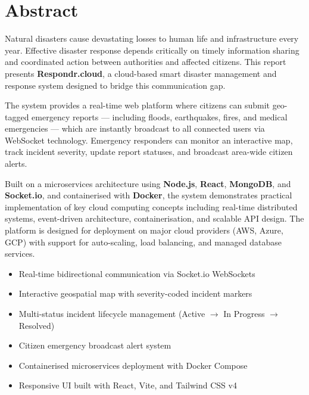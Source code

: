 \documentclass[12pt, a4paper]{report}
\begin{document}
\chapter*{Abstract}

Natural disasters cause devastating losses to human life and infrastructure every year. Effective disaster response depends critically on timely information sharing and coordinated action between authorities and affected citizens. This report presents \textbf{Respondr.cloud}, a cloud-based smart disaster management and response system designed to bridge this communication gap.

The system provides a real-time web platform where citizens can submit geo-tagged emergency reports --- including floods, earthquakes, fires, and medical emergencies --- which are instantly broadcast to all connected users via WebSocket technology. Emergency responders can monitor an interactive map, track incident severity, update report statuses, and broadcast area-wide citizen alerts.

Built on a microservices architecture using \textbf{Node.js}, \textbf{React}, \textbf{MongoDB}, and \textbf{Socket.io}, and containerised with \textbf{Docker}, the system demonstrates practical implementation of key cloud computing concepts including real-time distributed systems, event-driven architecture, containerisation, and scalable API design. The platform is designed for deployment on major cloud providers (AWS, Azure, GCP) with support for auto-scaling, load balancing, and managed database services.

\vspace{0.8cm}
\begin{infobox}
  \begin{itemize}[noitemsep]
    \item Real-time bidirectional communication via Socket.io WebSockets
    \item Interactive geospatial map with severity-coded incident markers
    \item Multi-status incident lifecycle management (Active $\rightarrow$ In Progress $\rightarrow$ Resolved)
    \item Citizen emergency broadcast alert system
    \item Containerised microservices deployment with Docker Compose
    \item Responsive UI built with React, Vite, and Tailwind CSS v4
  \end{itemize}
\end{infobox}
\end{document}
